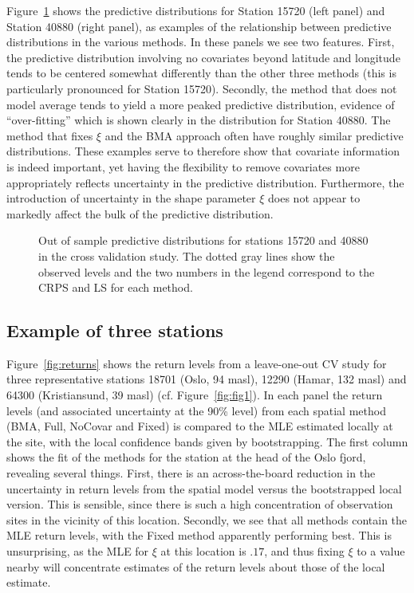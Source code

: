 \documentclass[11pt,english]{article}
\begin{document}
\indent Figure~\ref{fig:cv_examples} shows the predictive distributions for Station 15720 (left panel) and Station 40880 (right panel), as examples of the relationship between predictive distributions in the various methods.  In these panels we see two features.  First, the predictive distribution involving no covariates beyond latitude and longitude tends to be centered somewhat differently than the other three methods (this is particularly pronounced for Station 15720).  Secondly, the method that does not model average tends to yield a more peaked predictive distribution, evidence of ``over-fitting'' which is shown clearly in the distribution for Station 40880.  The method that fixes $\xi$ and the BMA approach often have roughly similar predictive distributions.  These examples serve to therefore show that covariate information is indeed important, yet having the flexibility to remove covariates more appropriately reflects uncertainty in the predictive distribution.  Furthermore, the introduction of uncertainty in the shape parameter $\xi$ does not appear to markedly affect the bulk of the predictive distribution.

\begin{figure}
\begin{center}
\end{center}
\caption{Out of sample predictive distributions for stations 15720 and 40880 in the cross validation study.  The dotted gray lines show the observed levels and the two numbers in the legend correspond to the CRPS and LS for each method.}\label{fig:cv_examples}
\end{figure}
\clearpage
\subsection{Example of three stations}\label{sec:example}
Figure~\ref{fig:returns} shows the return levels from a leave-one-out CV study for three representative stations 18701 (Oslo, 94 masl), 12290 (Hamar, 132 masl) and 64300 (Kristiansund, 39 masl) (cf. Figure~\ref{fig:fig1}).  In each panel the return levels (and associated uncertainty at the 90\% level) from each spatial method (BMA, Full, NoCovar and Fixed) is compared to the MLE estimated locally at the site, with the local confidence bands given by bootstrapping. The first column shows the fit of the methods for the station at the head of the Oslo fjord, revealing several things.  First, there is an across-the-board reduction in the uncertainty in return levels from the spatial model versus the bootstrapped local version.  This is sensible, since there is such a high concentration of observation sites in the vicinity of this location.  Secondly, we see that all methods contain the MLE return levels, with the Fixed method apparently performing best.  This is unsurprising, as the MLE for $\xi$ at this location is $.17$, and thus fixing $\xi$ to a value nearby will concentrate estimates of the return levels about those of the local estimate.
\end{document}
